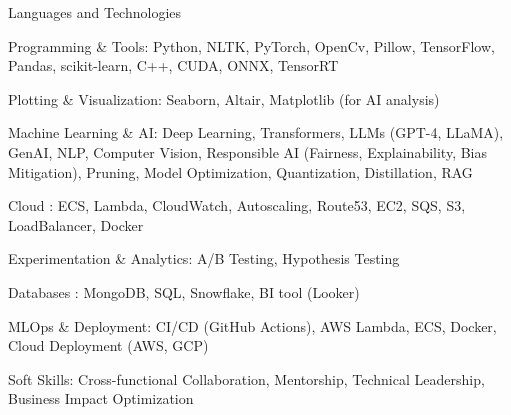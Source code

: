 

\begin{cventries}

  \cventry
    {Languages and Technologies}
    {}
    {}
    {}
    {
     \begin{cvitems} %
      \item {Programming \& Tools: Python, NLTK, PyTorch, OpenCv, Pillow, TensorFlow, Pandas, 
        scikit-learn, C++, CUDA, ONNX, TensorRT}	
      \item {Plotting \& Visualization: Seaborn, Altair, Matplotlib (for AI analysis)}
      \item {Machine Learning \& AI: Deep Learning, Transformers, LLMs (GPT-4, LLaMA), GenAI, NLP, 
        Computer Vision, Responsible AI (Fairness, Explainability, Bias Mitigation), Pruning, Model Optimization, Quantization, Distillation, RAG}	
      \item {Cloud : ECS, Lambda, CloudWatch, Autoscaling, Route53, EC2, SQS, S3, LoadBalancer, Docker}
      \item {Experimentation \& Analytics:  A/B Testing, Hypothesis Testing}
	    \item {Databases : MongoDB, SQL, Snowflake, BI tool (Looker)}
      \item {MLOps \& Deployment: CI/CD (GitHub Actions), AWS Lambda, ECS, Docker, Cloud Deployment (AWS, GCP)}
      \item {Soft Skills: Cross-functional Collaboration, Mentorship, Technical Leadership, Business Impact Optimization}
     \end{cvitems}
    }

\end{cventries}
